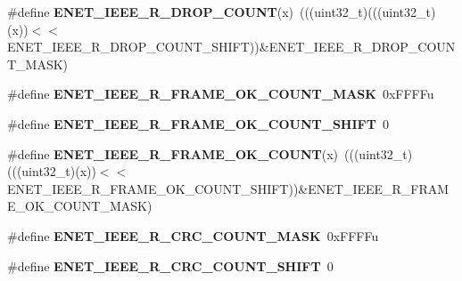 \begin{DoxyCompactItemize}
\item 
\#define {\bfseries E\+N\+E\+T\+\_\+\+I\+E\+E\+E\+\_\+\+R\+\_\+\+D\+R\+O\+P\+\_\+\+C\+O\+U\+NT}(x)~(((uint32\+\_\+t)(((uint32\+\_\+t)(x))$<$$<$E\+N\+E\+T\+\_\+\+I\+E\+E\+E\+\_\+\+R\+\_\+\+D\+R\+O\+P\+\_\+\+C\+O\+U\+N\+T\+\_\+\+S\+H\+I\+FT))\&E\+N\+E\+T\+\_\+\+I\+E\+E\+E\+\_\+\+R\+\_\+\+D\+R\+O\+P\+\_\+\+C\+O\+U\+N\+T\+\_\+\+M\+A\+SK)\hypertarget{group__ENET__Register__Masks_ga949d161e892827ef0d58e6dc6597885b}{}\label{group__ENET__Register__Masks_ga949d161e892827ef0d58e6dc6597885b}

\item 
\#define {\bfseries E\+N\+E\+T\+\_\+\+I\+E\+E\+E\+\_\+\+R\+\_\+\+F\+R\+A\+M\+E\+\_\+\+O\+K\+\_\+\+C\+O\+U\+N\+T\+\_\+\+M\+A\+SK}~0x\+F\+F\+F\+Fu\hypertarget{group__ENET__Register__Masks_ga61cc0d2a38667a1263e2233c7f9a4270}{}\label{group__ENET__Register__Masks_ga61cc0d2a38667a1263e2233c7f9a4270}

\item 
\#define {\bfseries E\+N\+E\+T\+\_\+\+I\+E\+E\+E\+\_\+\+R\+\_\+\+F\+R\+A\+M\+E\+\_\+\+O\+K\+\_\+\+C\+O\+U\+N\+T\+\_\+\+S\+H\+I\+FT}~0\hypertarget{group__ENET__Register__Masks_ga18b9d145aab58ab10347846c95e949a3}{}\label{group__ENET__Register__Masks_ga18b9d145aab58ab10347846c95e949a3}

\item 
\#define {\bfseries E\+N\+E\+T\+\_\+\+I\+E\+E\+E\+\_\+\+R\+\_\+\+F\+R\+A\+M\+E\+\_\+\+O\+K\+\_\+\+C\+O\+U\+NT}(x)~(((uint32\+\_\+t)(((uint32\+\_\+t)(x))$<$$<$E\+N\+E\+T\+\_\+\+I\+E\+E\+E\+\_\+\+R\+\_\+\+F\+R\+A\+M\+E\+\_\+\+O\+K\+\_\+\+C\+O\+U\+N\+T\+\_\+\+S\+H\+I\+FT))\&E\+N\+E\+T\+\_\+\+I\+E\+E\+E\+\_\+\+R\+\_\+\+F\+R\+A\+M\+E\+\_\+\+O\+K\+\_\+\+C\+O\+U\+N\+T\+\_\+\+M\+A\+SK)\hypertarget{group__ENET__Register__Masks_gaad53aabe1c637f933cde5311c9042ac7}{}\label{group__ENET__Register__Masks_gaad53aabe1c637f933cde5311c9042ac7}

\item 
\#define {\bfseries E\+N\+E\+T\+\_\+\+I\+E\+E\+E\+\_\+\+R\+\_\+\+C\+R\+C\+\_\+\+C\+O\+U\+N\+T\+\_\+\+M\+A\+SK}~0x\+F\+F\+F\+Fu\hypertarget{group__ENET__Register__Masks_ga58cf98c5746ff20054f1870ab0c9bc5e}{}\label{group__ENET__Register__Masks_ga58cf98c5746ff20054f1870ab0c9bc5e}

\item 
\#define {\bfseries E\+N\+E\+T\+\_\+\+I\+E\+E\+E\+\_\+\+R\+\_\+\+C\+R\+C\+\_\+\+C\+O\+U\+N\+T\+\_\+\+S\+H\+I\+FT}~0\hypertarget{group__ENET__Register__Masks_ga68234049dc9eac210f0412acb75b5aad}{}\label{group__ENET__Register__Masks_ga68234049dc9eac210f0412acb75b5aad}


\end{DoxyCompactItemize}
